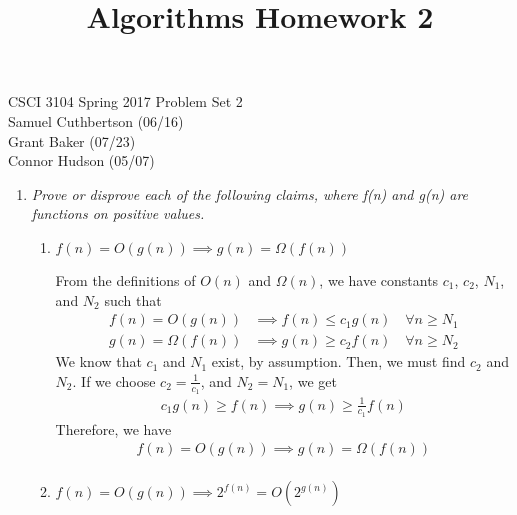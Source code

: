 \documentclass[12pt]{article}
\begin{document}
\title{Algorithms Homework 2}

CSCI 3104 Spring 2017 \hfill Problem Set 2\\
Samuel Cuthbertson (06/16)  \\
Grant Baker (07/23) \\
Connor Hudson (05/07) 

\hrulefill

\begin{enumerate}

	\item \textit{Prove or disprove each of the following claims, where f(n) and g(n) are
functions on positive values.}
    \begin{enumerate}
	\item \textit{$f(n) = O(g(n)) \implies g(n) = \Omega(f(n))$}
	
    From the definitions of $O(n)$ and $\Omega(n)$, we have constants $c_1$, $c_2$, $N_1$, and $N_2$ such that
    \begin{align*}
    f(n) = O(g(n)) &\implies f(n) \leq c_1g(n) \hspace{12pt} \forall n\geq N_1\\
    g(n) = \Omega(f(n)) &\implies g(n) \geq c_2f(n) \hspace{12pt} \forall n\geq N_2
    \end{align*}
    We know that $c_1$ and $N_1$ exist, by assumption. Then, we must find $c_2$ and $N_2$. If we choose $c_2 = \frac{1}{c_1}$, and $N_2 = N_1$, we get 
    \begin{align*}
    \boxed{c_1g(n) \geq f(n) \implies g(n) \geq \frac{1}{c_1}f(n) }
    \end{align*}
    Therefore, we have
    \begin{align*}
    f(n) = O(g(n)) \implies g(n) = \Omega(f(n)) \\
    \end{align*}
    
	\item \textit{$f(n) = O(g(n)) \implies 2^{f(n)} = O(2^{g(n)})$}
    

\end{enumerate}
\end{enumerate}
\end{document}
